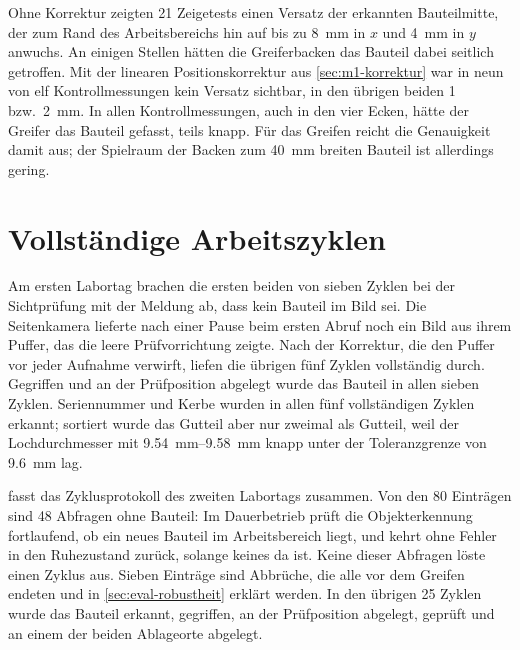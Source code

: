 Ohne Korrektur zeigten 21 Zeigetests einen Versatz der erkannten Bauteilmitte, der zum Rand des
Arbeitsbereichs hin auf bis zu \SI{8}{\milli\metre} in $x$ und \SI{4}{\milli\metre} in $y$
anwuchs. An einigen Stellen hätten die Greiferbacken das Bauteil dabei seitlich getroffen. Mit
der linearen Positionskorrektur aus \cref{sec:m1-korrektur} war in neun von elf
Kontrollmessungen kein Versatz sichtbar, in den übrigen beiden \SI{1}{} bzw.\
\SI{2}{\milli\metre}. In allen Kontrollmessungen, auch in den vier Ecken, hätte der Greifer das
Bauteil gefasst, teils knapp. Für das Greifen reicht die Genauigkeit damit aus; der Spielraum
der Backen zum \SI{40}{\milli\metre} breiten Bauteil ist allerdings gering.

\section{Vollständige Arbeitszyklen}
\label{sec:eval-zyklus}

Am ersten Labortag brachen die ersten beiden von sieben Zyklen bei der Sichtprüfung mit der
Meldung ab, dass kein Bauteil im Bild sei. Die Seitenkamera lieferte nach einer Pause beim
ersten Abruf noch ein Bild aus ihrem Puffer, das die leere Prüfvorrichtung zeigte. Nach der
Korrektur, die den Puffer vor jeder Aufnahme verwirft, liefen die übrigen fünf Zyklen
vollständig durch. Gegriffen und an der Prüfposition abgelegt wurde das Bauteil in allen sieben
Zyklen. Seriennummer und Kerbe wurden in allen fünf vollständigen Zyklen erkannt; sortiert wurde
das Gutteil aber nur zweimal als Gutteil, weil der Lochdurchmesser mit
\SIrange{9,54}{9,58}{\milli\metre} knapp unter der Toleranzgrenze von \SI{9,6}{\milli\metre}
lag.

 fasst das Zyklusprotokoll des zweiten Labortags zusammen. Von den
80 Einträgen sind 48 Abfragen ohne Bauteil: Im Dauerbetrieb prüft die Objekterkennung
fortlaufend, ob ein neues Bauteil im Arbeitsbereich liegt, und kehrt ohne Fehler in den
Ruhezustand zurück, solange keines da ist. Keine dieser Abfragen löste einen Zyklus aus. Sieben
Einträge sind Abbrüche, die alle vor dem Greifen endeten und in \cref{sec:eval-robustheit}
erklärt werden. In den übrigen 25 Zyklen wurde das Bauteil erkannt, gegriffen, an der
Prüfposition abgelegt, geprüft und an einem der beiden Ablageorte abgelegt.

